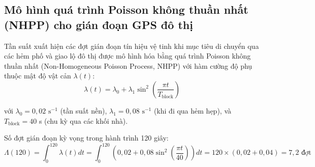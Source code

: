 \subsection{Mô hình quá trình Poisson không thuần nhất (NHPP) cho gián đoạn GPS đô thị}

\hspace{0.5cm} Tần suất xuất hiện các đợt gián đoạn tín hiệu vệ tinh khi mục tiêu di chuyển qua các hẻm phố và giao lộ đô thị được mô hình hóa bằng quá trình Poisson không thuần nhất (Non-Homogeneous Poisson Process, NHPP) với hàm cường độ phụ thuộc mật độ vật cản $\lambda(t)$:
\begin{equation}
\lambda(t) = \lambda_0 + \lambda_1 \sin^2\left(\frac{\pi t}{T_{\text{block}}}\right)
\label{eq:nhpp-intensity-formula}
\end{equation}

với $\lambda_0 = 0{,}02\text{ s}^{-1}$ (tần suất nền), $\lambda_1 = 0{,}08\text{ s}^{-1}$ (khi đi qua hẻm hẹp), và $T_{\text{block}} = 40$ s (chu kỳ qua các khối nhà).

Số đợt gián đoạn kỳ vọng trong hành trình 120 giây:
\begin{equation}
\Lambda(120) = \int_0^{120} \lambda(t) dt = \int_0^{120} \left(0{,}02 + 0{,}08 \sin^2\left(\frac{\pi t}{40}\right)\right) dt = 120 \times (0{,}02 + 0{,}04) = 7{,}2\text{ đợt}
\label{eq:nhpp-expected-outages}
\end{equation}

\begin{table}[H]
\centering
\caption{Xác suất xuất hiện số đợt gián đoạn GPS trong hành trình 120 giây theo mô hình NHPP}
\label{tab:nhpp-outage-probability-table}
\end{table}

